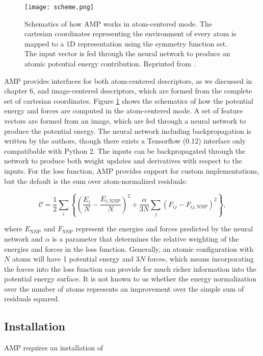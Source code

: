 \begin{figure}[H]
\centering
\texttt{[image: scheme.png]}
\caption{Schematics of how AMP works in atom-centered mode.
    The cartesian coordinates representing the environment
    of every atom is mapped to a 1D representation using the
    symmetry function set. The input vector is fed through the neural
    network to produce an atomic potential energy contribution.
    Reprinted from \parencite[AMP paper]{khorshidi2016amp}.}
\label{fig:scheme}
\end{figure}

AMP provides interfaces for both atom-centered descriptors, as we
discussed in chapter 6, and image-centered descriptors,
which are formed from the complete set of cartesian coordinates.
Figure \ref{fig:scheme} shows the schematics of how the
potential energy and forces are computed in the atom-centered mode.
A set of feature vectors are formed from an image, which are fed
through a neural network to produce the potential energy.
The neural network including backpropagation is written by the
authors, though there exists a Tensorflow (0.12) interface
only compatibable with Python 2.
The inputs can be backpropagated through the network
to produce both weight updates and derivatives with respect to
the inputs.
For the loss function, AMP provides support for custom implementations,
but the default is the sum over atom-normalized residuals:

\begin{equation}
    \mathcal{C} = \frac{1}{2} \sum_{i} \left\{
        \left(\frac{E_i}{N} - \frac{E_{i, \text{NNP}}}{N}\right)^2 +
        \frac{\alpha}{3N} \sum_{j} \left(F_{ij} - F_{ij, \text{NNP}}
        \right)^2 \right\},
\end{equation}

where $E_{\text{NNP}}$ and $F_{\text{NNP}}$ 
represent the energies and forces predicted
by the neural network and
$\alpha$ is a parameter that determines the relative weighting
of the energies and forces in the loss function.
Generally, an atomic configuration with $N$ atoms will have 1 potential
energy and $3N$ forces, which means incorporating the forces into
the loss function can provide for much richer information into
the potential energy surface.
It is not known to us whether the energy normalization over the number of atoms
represents an improvement over the simple sum of residuals squared.

\subsection{Installation}
AMP requires an installation of

